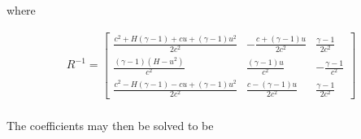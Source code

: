 \documentclass[11pt]{article}%
\numberwithin{equation}{section}
\begin{document}
where 

\begin{equation}
\begin{split}
R^{-1} = \left[ \begin{array}{ccc} \frac{c^2 + H (\gamma-1) + c u + (\gamma-1) u^2}{2 c^2} & -\frac{c + (\gamma - 1) u}{2 c^2} & \frac{\gamma - 1}{2 c^2} \\ \frac{ (\gamma - 1) (H - u^2)}{c^2} & \frac{(\gamma - 1) u}{c^2} & - \frac{\gamma - 1}{c^2} \\   \frac{c^2 - H (\gamma - 1) - c u + (\gamma - 1) u^2}{2 c^2} & \frac{c - (\gamma - 1) u}{2 c^2} & \frac{\gamma - 1}{2 c^2} \end{array} \right] \\ 
\end{split}
\end{equation}


The coefficients may then be solved to be
\end{document}
